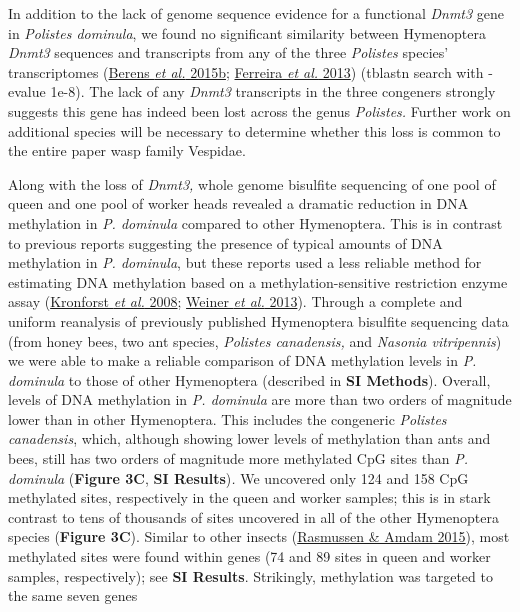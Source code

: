 In addition to the lack of genome sequence evidence for a functional
\textit{Dnmt3} gene in \textit{Polistes dominula}, we found no significant
similarity between Hymenoptera \textit{Dnmt3} sequences and transcripts
from any of the three \textit{Polistes} species' transcriptomes
(\protect\hyperlink{ux5fENREFux5f3}{Berens \textit{et al.} 2015b};
\protect\hyperlink{ux5fENREFux5f10}{Ferreira \textit{et al.} 2013})
(tblastn search with -evalue 1e-8). The lack of any \textit{Dnmt3}
transcripts in the three congeners strongly suggests this gene has
indeed been lost across the genus \textit{Polistes.} Further work on
additional species will be necessary to determine whether this loss is
common to the entire paper wasp family Vespidae.

Along with the loss of \textit{Dnmt3,} whole genome bisulfite sequencing
of one pool of queen and one pool of worker heads revealed a dramatic
reduction in DNA methylation in \textit{P. dominula} compared to other
Hymenoptera. This is in contrast to previous reports suggesting the
presence of typical amounts of DNA methylation in \textit{P. dominula},
but these reports used a less reliable method for estimating DNA
methylation based on a methylation-sensitive restriction enzyme assay
(\protect\hyperlink{ux5fENREFux5f26}{Kronforst \textit{et al.} 2008};
\protect\hyperlink{ux5fENREFux5f67}{Weiner \textit{et al.} 2013}). Through
a complete and uniform reanalysis of previously published Hymenoptera
bisulfite sequencing data (from honey bees, two ant species,
\textit{Polistes canadensis,} and \textit{Nasonia vitripennis}) we were able
to make a reliable comparison of DNA methylation levels in \textit{P.
dominula} to those of other Hymenoptera (described in \textbf{SI
Methods}). Overall, levels of DNA methylation in \textit{P. dominula} are
more than two orders of magnitude lower than in other Hymenoptera. This
includes the congeneric \textit{Polistes canadensis}, which, although
showing lower levels of methylation than ants and bees, still has two
orders of magnitude more methylated CpG sites than \textit{P. dominula}
(\textbf{Figure 3C}, \textbf{SI Results})\textit{.} We uncovered only 124
and 158 CpG methylated sites, respectively in the queen and worker
samples; this is in stark contrast to tens of thousands of sites
uncovered in all of the other Hymenoptera species (\textbf{Figure 3C}).
Similar to other insects (\protect\hyperlink{ux5fENREFux5f45}{Rasmussen
\& Amdam 2015}), most methylated sites were found within genes (74 and
89 sites in queen and worker samples, respectively); see \textbf{SI
Results}. Strikingly, methylation was targeted to the same seven genes
